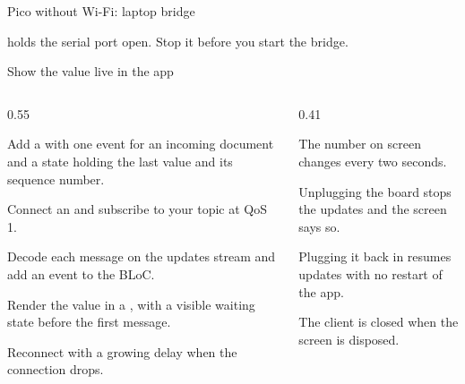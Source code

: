 \documentclass[10pt,aspectratio=169,t]{beamer}
\begin{document}
\begin{frame}[embedded,fragile,eyebrow=Task II]{Pico without Wi-Fi: laptop bridge}
  \vskip 1mm
  \vskip 1mm
  \vskip 2mm
  \begin{warning}
     holds the serial port open. Stop it before you start the bridge.
  \end{warning}
\end{frame}

\begin{frame}[eyebrow=Task III]{Show the value live in the app}
  \begin{columns}[T]
    \begin{column}{0.55\textwidth}
      \begin{steps}
        \item Add a  with one event for an incoming document and a state holding the last value and its sequence number.
        \item Connect an  and subscribe to your topic at QoS 1.
        \item Decode each message on the updates stream and add an event to the BLoC.
        \item Render the value in a , with a visible waiting state before the first message.
        \item Reconnect with a growing delay when the connection drops.
      \end{steps}
    \end{column}
    \begin{column}{0.41\textwidth}
      \begin{checklist}
        \item The number on screen changes every two seconds.
        \item Unplugging the board stops the updates and the screen says so.
        \item Plugging it back in resumes updates with no restart of the app.
        \item The client is closed when the screen is disposed.
      \end{checklist}
    \end{column}
  \end{columns}
\end{frame}
\end{document}
